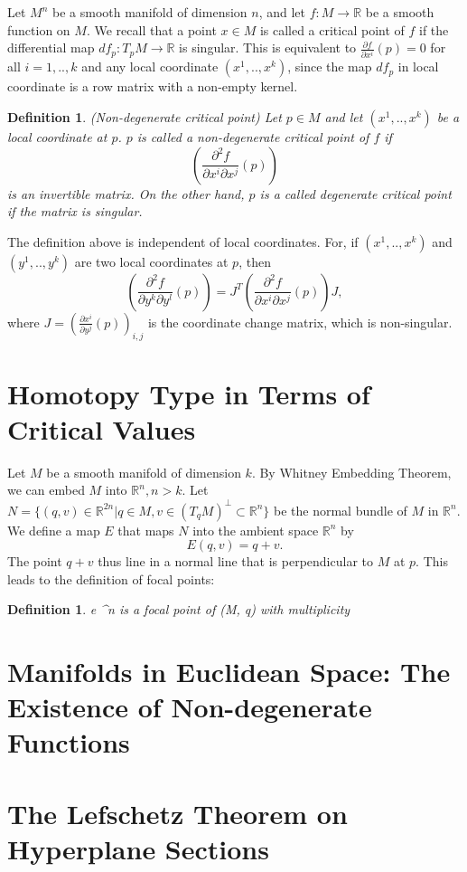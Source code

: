 \documentclass[12pt]{article}
\newtheorem{defn}[thm]{Definition}
\newcommand{\RR}{\mathbb{R}}      %
\begin{document}
Let $M^n$ be a smooth manifold of dimension $n$, and let $f: M \to \RR$ be a
smooth function on $M$. We recall that a point $x \in M$ is called a critical
point of $f$ if the differential map $ df_p : T_pM \to \RR $ is singular. This
is equivalent to $\frac{\partial f}{\partial x^i} (p) = 0$ for all $i = 1,
.. ,k$ and any local coordinate $(x^1, .., x^k)$, since the map $df_p$ in local
coordinate is a row matrix with a non-empty kernel.

\begin{defn}
  (Non-degenerate critical point) Let $p \in M$ and let $(x^1, .., x^k)$ be a
  local coordinate at $p$. $p$ is called a non-degenerate critical point of $f$
  if
  \begin{equation}
    \left( \frac{\partial^2 f}{\partial x^i \partial x^j} (p) \right)
  \end{equation}
  is an invertible matrix. On the other hand, $p$ is a called degenerate
  critical point if the matrix is singular.
\end{defn}

The definition above is independent of local coordinates. For, if $(x^1, ..,
x^k)$ and $(y^1, .., y^k)$ are two local coordinates at $p$, then
\begin{equation}
      \left( \frac{\partial^2 f}{\partial y^k \partial y^l} (p) \right) =
      J^T\left( \frac{\partial^2 f}{\partial x^i \partial x^j} (p) \right)J,
\end{equation}
where $J = \left( \frac{\partial x^i}{\partial y^j}(p) \right)_{i,j}$ is the
coordinate change matrix, which is non-singular.

\section{Homotopy Type in Terms of Critical Values}

Let $M$ be a smooth manifold of dimension $k$. By Whitney Embedding Theorem, we
can embed $M$ into $\RR^n, n > k$. Let $N = \{ (q,v) \in \RR^{2n} | q \in M, v
\in (T_qM)^{\perp} \subset \RR^n \}$ be the normal bundle of $M$ in $\RR^n$. We
define a map $E$ that maps $N$ into the ambient space $\RR^n$ by
\begin{equation}
  E(q, v) = q + v.
\end{equation}
The point $q+v$ thus line in a normal line that is perpendicular to $M$ at
$p$. This leads to the definition of focal points:

\begin{defn}
  e \in \RR^n is a focal point of (M, q) with multiplicity \mu 
\end{defn}


\section{Manifolds in Euclidean Space: The Existence of Non-degenerate
  Functions}




\section{The Lefschetz Theorem on Hyperplane Sections}
\end{document}
